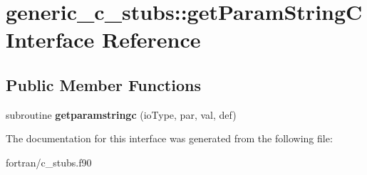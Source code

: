 \hypertarget{interfacegeneric__c__stubs_1_1get_param_string_c}{}\section{generic\+\_\+c\+\_\+stubs\+:\+:get\+Param\+StringC Interface Reference}
\label{interfacegeneric__c__stubs_1_1get_param_string_c}
\subsection*{Public Member Functions}
\begin{DoxyCompactItemize}
\item 
\mbox{\label{interfacegeneric__c__stubs_1_1get_param_string_c_ac02d77e7d3c86f77533208bf3d605511}} 
subroutine {\bfseries getparamstringc} (io\+Type, par, val, def)
\end{DoxyCompactItemize}


The documentation for this interface was generated from the following file\+:\begin{DoxyCompactItemize}
\item 
fortran/c\+\_\+stubs.\+f90\end{DoxyCompactItemize}
